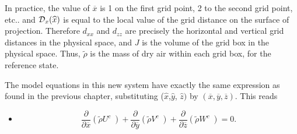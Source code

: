 In practice, the value of $\overline{x}$ is 1 on the first grid point,
2 to the second grid point, etc.. and ${\cal D}_x(\widehat{x})$
is equal to the local value of the grid distance on the surface of projection.
Therefore $d_{xx}$ and $d_{zz}$ are precisely the horizontal
and vertical grid distances in the physical space, and $J$ is the volume
of the grid box in the physical space. Thus, $\tilde{\rho}$ is the mass of
dry air within each grid box, for the reference state.


The model equations in this new system have exactly the same
expression as found in the previous chapter, substituting
 ($\widehat{x}$,$\widehat{y}$, $\widehat{z})$  by
 $( \overline{x},\overline{y},\overline{z})$.
This reads

\begin{itemize}
\item {}
\begin{equation}
\dfrac{\partial }{\partial \overline{x}} (\tilde{\rho} U^{c} \; )
+ \dfrac{\partial }{\partial \overline{y}} (\tilde{\rho} V^{c} \; )
+ \dfrac{\partial }{\partial \overline{z}} (\tilde{\rho} W^{c} \; ) =0.
\end{equation}


\end{itemize}
